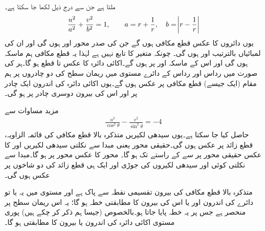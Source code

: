 ملتا ہے جن سے درج ذیل لکھا جا سکتا ہے۔
\begin{align*}
\frac{u^2}{a^2}+\frac{v^2}{b^2}=1,\quad \quad a=r+\frac{1}{r},\quad b=\abs{r-\frac{1}{r}}
\end{align*}
یوں  دائروں کا عکس قطع مکافی ہوں گے جن کی صدر محور  اور  ہوں گی اور ان کی لمبائیاں بالترتیب  اور  ہوں گی۔ چونکہ  متغیر  کا تابع نہیں ہے لہٰذا یہ قطع مکافی ہم ماسکہ ہوں گی اور اس کے ماسکہ  اور  پر ہوں  گے۔اکائی دائرہ  کا عکس  تا  قطع ہو گا۔ہر  کی صورت میں رداس  اور رداس  کے دائرے   مستوی میں ریمان سطح کی دو چادروں پر ہم مقام (ایک جیسے)  قطع مکافی پر عکس ہوں گے۔یوں اکائی دائرہ  کی اندرون ایک چادر پر اور اس کی بیرون دوسری چادر پر ہو گی۔

مزید مساوات  سے
\begin{align}
\frac{u^2}{\cos^2\theta}-\frac{v^2}{\sin^2\theta}=-4
\end{align}
حاصل کیا جا سکتا ہے۔یوں سیدھی لکیریں  متذکرہ بالا قطع مکافی کی قائمہ الزاویہ، قطع زائد پر عکس ہوں گی۔حقیقی محور یعنی مبدا سے نکلتی سیدھی لکیریں  اور  کا عکس حقیقی محور پر  سے  کے راستے  تک  ہو گا۔  محور کا عکس   محور پر ہو گا۔مبدا سے نکلتی کوئی اور سیدھی لکیروں کی جوڑی   اور  ایک ہی قطع زائد کی دو شاخوں پر عکس ہوں گی۔

متذکرہ بالا قطع مکافی کی بیرون تقسیمی نقطہ سے پاک ہے اور  مستوی میں یہ یا تو دائرے کی اندرون اور یا اس کی بیرون کا مطابقتی خطہ ہو گا؛ یہ اس ریمان سطح پر منحصر ہے جس پر یہ خطہ پایا جاتا ہو۔بالخصوص (جیسا ہم ذکر کر چکے ہیں) پوری  مستوی اکائی دائرہ  کی اندرون یا بیرون کا مطابقتی ہو گا۔

